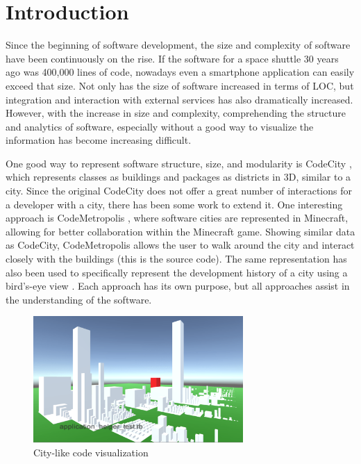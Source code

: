 \documentclass[conference]{IEEEtran}
\begin{document}
\section{Introduction}
Since the beginning of software development, the size and complexity of software have been continuously on the rise.
If the software for a space shuttle 30 years ago was 400,000 lines of code, nowadays even a smartphone application can easily exceed that size.
Not only has the size of software increased in terms of LOC, but integration and interaction with external services has also dramatically increased.
However, with the increase in size and complexity, comprehending the structure and analytics of software, especially without a good way to visualize the information has become increasing difficult.

One good way to represent software structure, size, and modularity is \textsf{CodeCity} \cite{Wettel:2011:SSC:1985793.1985868}, which represents classes as buildings and packages as districts in 3D, similar to a city.
Since the original \textsf{CodeCity} does not offer a great number of interactions for a developer with a city, there has been some work to extend it. 
One interesting approach is \textsf{CodeMetropolis} \cite{6648194}, where software cities are represented in \textsf{Minecraft}, allowing for better collaboration within the \textsf{Minecraft} game.
Showing similar data as \textsf{CodeCity}, \textsf{CodeMetropolis} allows the user to walk around the city and interact closely with the buildings (this is the source code).
The same representation has also been used to specifically represent the development history of a city using a bird's-eye view \cite{Steinbruckner:2010:RDH:1879211.1879239}.
Each approach has its own purpose, but all approaches assist in the understanding of the software.

\begin{figure}[h]
\centering
\includegraphics[width=8cm]{NewROCAT.pdf}
\caption{City-like code visualization}
\label{figure:new-Rocat}
\end{figure}
\end{document}
